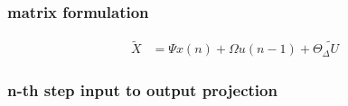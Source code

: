 \documentclass{beamer}
\begin{document}
\begin{frame}
  
  \frametitle{\bf matrix formulation}


  \begin{align*}
    \tilde{X} &= \Psi x(n) + \Omega u(n-1) + \Theta \tilde{_\Delta U}
  \end{align*}
\end{frame}




\begin{frame}
  
  \frametitle{\bf n-th step input to output projection}


\end{frame}
\end{document}
